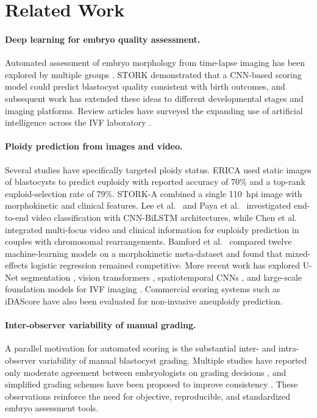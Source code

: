 \section{Related Work}

\paragraph{Deep learning for embryo quality assessment.}
Automated assessment of embryo morphology from time-lapse imaging has been explored by multiple groups \citep{khosravi2019deep,paya2022contrastive,canat2024morphokinetic,jiang2023airreview}. STORK \citep{khosravi2019deep} demonstrated that a CNN-based scoring model could predict blastocyst quality consistent with birth outcomes, and subsequent work has extended these ideas to different developmental stages and imaging platforms. Review articles have surveyed the expanding use of artificial intelligence across the IVF laboratory \citep{jiang2023airreview}.

\paragraph{Ploidy prediction from images and video.}
Several studies have specifically targeted ploidy status. ERICA \citep{chavezbadiola2020erica} used static images of blastocysts to predict euploidy with reported accuracy of 70\% and a top-rank euploid-selection rate of 79\%. STORK-A \citep{barnes2023nonhinvasive} combined a single 110~hpi image with morphokinetic and clinical features. Lee et al.\ \citep{lee2021endtoend} and Paya et al.\ \citep{paya2023deeplearning} investigated end-to-end video classification with CNN-BiLSTM architectures, while Chen et al.\ \citep{chen2023knowledge} integrated multi-focus video and clinical information for euploidy prediction in couples with chromosomal rearrangements. Bamford et al.\ \citep{bamford2023ml12} compared twelve machine-learning models on a morphokinetic meta-dataset and found that mixed-effects logistic regression remained competitive. More recent work has explored U-Net segmentation \citep{handayani2024unet}, vision transformers \citep{avidiansyah2025vit}, spatiotemporal CNNs \citep{maekawa2026aiprediction}, and large-scale foundation models for IVF imaging \citep{rajendran2025femi}. Commercial scoring systems such as iDAScore \citep{ma2024idascore} have also been evaluated for non-invasive aneuploidy prediction.

\paragraph{Inter-observer variability of manual grading.}
A parallel motivation for automated scoring is the substantial inter- and intra-observer variability of manual blastocyst grading. Multiple studies have reported only moderate agreement between embryologists on grading decisions \citep{paternot2009intra,paternot2011multicentre,hammond2020freeze}, and simplified grading schemes have been proposed to improve consistency \citep{richardson2015grading}. These observations reinforce the need for objective, reproducible, and standardized embryo assessment tools.

